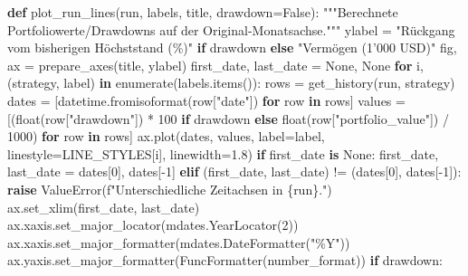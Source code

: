 \documentclass[
  ngerman,
  a4paper,
  DIV=11,
  oneside]{scrreprt}
\newenvironment{Shaded}{\begin{snugshade}}{\end{snugshade}}
\newcommand{\BuiltInTok}[1]{\textcolor[rgb]{0.00,0.23,0.31}{#1}}
\newcommand{\CommentTok}[1]{\textcolor[rgb]{0.37,0.37,0.37}{#1}}
\newcommand{\ControlFlowTok}[1]{\textcolor[rgb]{0.00,0.23,0.31}{\textbf{#1}}}
\newcommand{\DecValTok}[1]{\textcolor[rgb]{0.68,0.00,0.00}{#1}}
\newcommand{\FloatTok}[1]{\textcolor[rgb]{0.68,0.00,0.00}{#1}}
\newcommand{\KeywordTok}[1]{\textcolor[rgb]{0.00,0.23,0.31}{\textbf{#1}}}
\newcommand{\NormalTok}[1]{\textcolor[rgb]{0.00,0.23,0.31}{#1}}
\newcommand{\OperatorTok}[1]{\textcolor[rgb]{0.37,0.37,0.37}{#1}}
\newcommand{\PreprocessorTok}[1]{\textcolor[rgb]{0.68,0.00,0.00}{#1}}
\newcommand{\SpecialCharTok}[1]{\textcolor[rgb]{0.37,0.37,0.37}{#1}}
\newcommand{\SpecialStringTok}[1]{\textcolor[rgb]{0.13,0.47,0.30}{#1}}
\newcommand{\StringTok}[1]{\textcolor[rgb]{0.13,0.47,0.30}{#1}}
\newcommand{\VariableTok}[1]{\textcolor[rgb]{0.07,0.07,0.07}{#1}}
\begin{document}
\begin{Shaded}
\begin{Highlighting}[]
\KeywordTok{def}\NormalTok{ plot\_run\_lines(run, labels, title, drawdown}\OperatorTok{=}\VariableTok{False}\NormalTok{):}
    \CommentTok{"""Berechnete Portfoliowerte/Drawdowns auf der Original{-}Monatsachse."""}
\NormalTok{    ylabel }\OperatorTok{=} \StringTok{"Rückgang vom bisherigen Höchststand (\%)"} \ControlFlowTok{if}\NormalTok{ drawdown }\ControlFlowTok{else} \StringTok{"Vermögen (1’000 USD)"}
\NormalTok{    fig, ax }\OperatorTok{=}\NormalTok{ prepare\_axes(title, ylabel)}
\NormalTok{    first\_date, last\_date }\OperatorTok{=} \VariableTok{None}\NormalTok{, }\VariableTok{None}
    \ControlFlowTok{for}\NormalTok{ i, (strategy, label) }\KeywordTok{in} \BuiltInTok{enumerate}\NormalTok{(labels.items()):}
\NormalTok{        rows }\OperatorTok{=}\NormalTok{ get\_history(run, strategy)}
\NormalTok{        dates }\OperatorTok{=}\NormalTok{ [datetime.fromisoformat(row[}\StringTok{"date"}\NormalTok{]) }\ControlFlowTok{for}\NormalTok{ row }\KeywordTok{in}\NormalTok{ rows]}
\NormalTok{        values }\OperatorTok{=}\NormalTok{ [(}\BuiltInTok{float}\NormalTok{(row[}\StringTok{"drawdown"}\NormalTok{]) }\OperatorTok{*} \DecValTok{100} \ControlFlowTok{if}\NormalTok{ drawdown}
                   \ControlFlowTok{else} \BuiltInTok{float}\NormalTok{(row[}\StringTok{"portfolio\_value"}\NormalTok{]) }\OperatorTok{/} \DecValTok{1000}\NormalTok{) }\ControlFlowTok{for}\NormalTok{ row }\KeywordTok{in}\NormalTok{ rows]}
\NormalTok{        ax.plot(dates, values, label}\OperatorTok{=}\NormalTok{label, linestyle}\OperatorTok{=}\NormalTok{LINE\_STYLES[i], linewidth}\OperatorTok{=}\FloatTok{1.8}\NormalTok{)}
        \ControlFlowTok{if}\NormalTok{ first\_date }\KeywordTok{is} \VariableTok{None}\NormalTok{:}
\NormalTok{            first\_date, last\_date }\OperatorTok{=}\NormalTok{ dates[}\DecValTok{0}\NormalTok{], dates[}\OperatorTok{{-}}\DecValTok{1}\NormalTok{]}
        \ControlFlowTok{elif}\NormalTok{ (first\_date, last\_date) }\OperatorTok{!=}\NormalTok{ (dates[}\DecValTok{0}\NormalTok{], dates[}\OperatorTok{{-}}\DecValTok{1}\NormalTok{]):}
            \ControlFlowTok{raise} \PreprocessorTok{ValueError}\NormalTok{(}\SpecialStringTok{f"Unterschiedliche Zeitachsen in }\SpecialCharTok{\{}\NormalTok{run}\SpecialCharTok{\}}\SpecialStringTok{."}\NormalTok{)}
\NormalTok{    ax.set\_xlim(first\_date, last\_date)}
\NormalTok{    ax.xaxis.set\_major\_locator(mdates.YearLocator(}\DecValTok{2}\NormalTok{))}
\NormalTok{    ax.xaxis.set\_major\_formatter(mdates.DateFormatter(}\StringTok{"\%Y"}\NormalTok{))}
\NormalTok{    ax.yaxis.set\_major\_formatter(FuncFormatter(number\_format))}
    \ControlFlowTok{if}\NormalTok{ drawdown:}

\end{Highlighting}
\end{Shaded}
\end{document}

